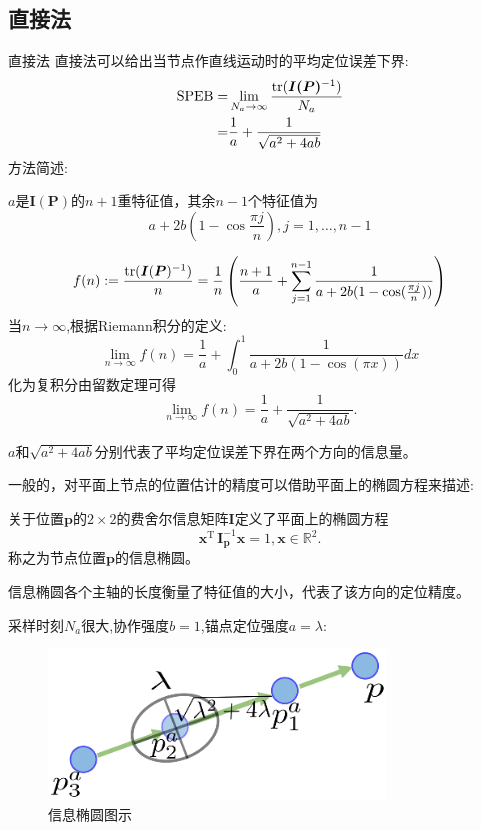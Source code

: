 \subsection{直接法}
\begin{frame}{直接法}
直接法可以给出当节点作直线运动时的平均定位误差下界:
\begin{align*}
  \text{SPEB}=&\lim_{N_a \to \infty}\frac{\operatorname{tr}(\bm{I(\bm{P})}^{-1})}{N_a}\\
  =&\frac{1}{a}+\frac{1}{\sqrt{a^2+4ab}}\\
\end{align*}
{\noindent 方法简述:}

$a$是$\bm{I}(\bm{P})$的$ n+1$重特征值，其余$n-1$个特征值为
\[
a+2b\left(1-\cos\frac{\pi j}{n}\right),j=1,\dots,n-1
\]
\end{frame}
\begin{frame}
\[
f(n):=\frac{\operatorname{tr}(\bm{I}(\bm{P})^{-1})}{n}=\frac{1}{n}\left(\frac{n+1}{a}+\sum_{j=1}^{n-1}\frac{1}{a+2b(1-\cos(\frac{\pi j}{n}))}\right)
\]
当$n\to \infty$,根据Riemann积分的定义:
\[
\lim_{n\rightarrow \infty}f(n)=\frac{1}{a}+\int_0^1 \frac{1}{a+2b(1-\cos(\pi x))}dx
\]
化为复积分由留数定理可得
\[
\lim_{n\rightarrow \infty}f(n)=\frac{1}{a}+\frac{1}{\sqrt{a^2+4ab}}.
\]
\end{frame}
\begin{frame}
$a$和${\sqrt{a^2+4ab}}$分别代表了平均定位误差下界在两个方向的信息量。


一般的，对平面上节点的位置估计的精度可以借助平面上的椭圆方程来描述:
\begin{definition}
关于位置$\bm{p}$的$2\times 2$的费舍尔信息矩阵$\bm{I}$定义了平面上的椭圆方程
\[
\bm{x}^{\textrm{T}}\,\bm{I}_{\bm{p}}^{-1}\bm{x}=1,\bm{x}\in \mathbb{R}^2.
\]
称之为节点位置$\bm{p}$的\alert{信息椭圆}。
\end{definition}
\pause
\end{frame}
\begin{frame}
信息椭圆各个主轴的长度衡量了特征值的大小，代表了该方向的定位精度。

采样时刻$N_a$很大,协作强度$b=1$,锚点定位强度$a=\lambda$:
\begin{figure}
\centering
\includegraphics[width=0.8\textwidth]{direct.eps}
\caption*{信息椭圆图示}
\end{figure}
\end{frame}
